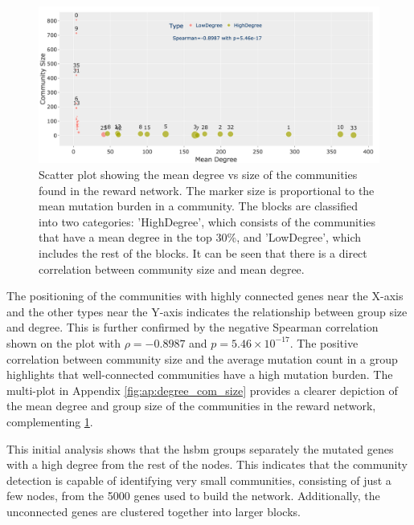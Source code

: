 \begin{figure}[!b]    
    \centering
    \includegraphics[width=1.0\textwidth,height=1.0\textheight,keepaspectratio]{Sections/Network_II/resources/reward/LargeSmall_com.png}
    \caption{Scatter plot showing the mean degree vs size of the communities found in the reward network. The marker size is proportional to the mean mutation burden in a community. The blocks are classified into two categories: 'HighDegree', which consists of the communities that have a mean degree in the top 30\%, and 'LowDegree', which includes the rest of the blocks. It can be seen that there is a direct correlation between community size and mean degree.}
    \label{fig:N_II:largeSmall_com}
\end{figure}

The positioning of the communities with highly connected genes near the X-axis and the other types near the Y-axis indicates the relationship between group size and degree. This is further confirmed by the negative Spearman correlation shown on the plot with $\rho = -0.8987$ and $p = 5.46 \times 10^{-17}$. The positive correlation between community size and the average mutation count in a group highlights that well-connected communities have a high mutation burden. The multi-plot in Appendix \cref{fig:ap:degree_com_size} provides a clearer depiction of the mean degree and group size of the communities in the reward network, complementing \cref{fig:N_II:largeSmall_com}.


This initial analysis shows that the \acrfull{hsbm} groups separately the mutated genes with a high degree from the rest of the nodes. This indicates that the community detection is capable of identifying very small communities, consisting of just a few nodes, from the 5000 genes used to build the network. Additionally, the unconnected genes are clustered together into larger blocks.


